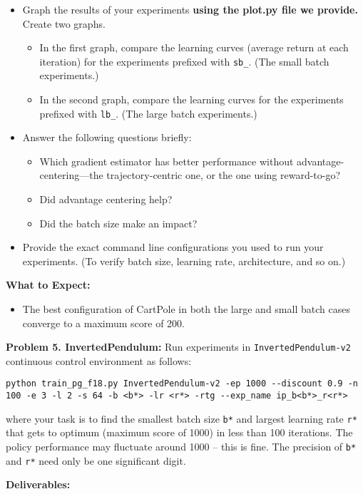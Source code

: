 \documentclass[12pt]{article}
\begin{document}
\begin{itemize}
\item Graph the results of your experiments \textbf{using the plot.py file we provide.} Create two graphs. 
\begin{itemize}
\item In the first graph, compare the learning curves (average return at each iteration) for the experiments prefixed with \verb|sb_|. (The small batch experiments.)
\item In the second graph, compare the learning curves for the experiments prefixed with \verb|lb_|. (The large batch experiments.)
\end{itemize}
\item Answer the following questions briefly: 
\begin{itemize}
\item Which gradient estimator has better performance without advantage-centering---the trajectory-centric one, or the one using reward-to-go? 
\item Did advantage centering help?
\item Did the batch size make an impact?
\end{itemize}
\item Provide the exact command line configurations you used to run your experiments. (To verify batch size, learning rate, architecture, and so on.)
\end{itemize}

\textbf{What to Expect:}
\begin{itemize}
\item The best configuration of CartPole in both the large and small batch cases converge to a maximum score of 200.
\end{itemize}


\textbf{Problem 5. InvertedPendulum:} Run experiments in \verb|InvertedPendulum-v2| continuous control environment as follows:
\begin{lstlisting}
python train_pg_f18.py InvertedPendulum-v2 -ep 1000 --discount 0.9 -n 100 -e 3 -l 2 -s 64 -b <b*> -lr <r*> -rtg --exp_name ip_b<b*>_r<r*>
\end{lstlisting}
where your task is to find the smallest batch size \texttt{b*} and largest learning rate \texttt{r*} that gets to optimum (maximum score of 1000) in less than 100 iterations. The policy performance may fluctuate around 1000 -- this is fine. The precision of \texttt{b*} and \texttt{r*} need only be one significant digit.

\textbf{Deliverables:}
\end{document}
